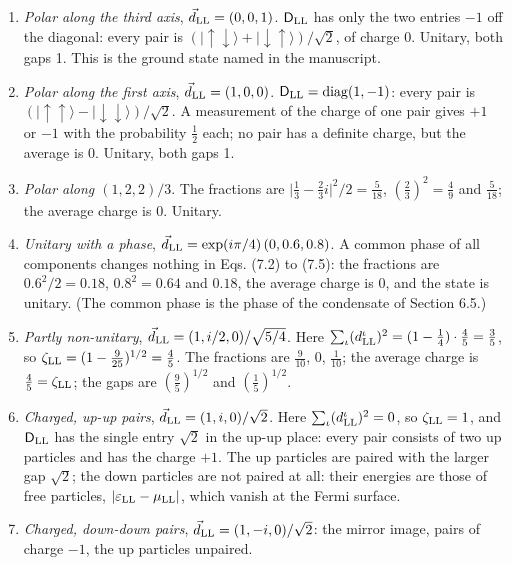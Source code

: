 \documentclass[
  10pt,
]{article}
\providecommand{\tightlist}{%
  \setlength{\itemsep}{0pt}\setlength{\parskip}{0pt}}
\begin{document}
\begin{enumerate}
\def\labelenumi{\arabic{enumi}.}
\tightlist
\item
  \emph{Polar along the third axis}, \(\vec d_{\rm LL}=(0,0,1)\).
  \(\mathsf D_{\rm LL}\) has only the two entries \(-1\) off the
  diagonal: every pair is
  \((\lvert\uparrow\downarrow\rangle+\lvert\downarrow\uparrow\rangle)/\sqrt2\),
  of charge 0. Unitary, both gaps 1. This is the ground state named in
  the manuscript.
\item
  \emph{Polar along the first axis}, \(\vec d_{\rm LL}=(1,0,0)\).
  \(\mathsf D_{\rm LL}=\mathrm{diag}(1,-1)\): every pair is
  \((\lvert\uparrow\uparrow\rangle-\lvert\downarrow\downarrow\rangle)/\sqrt2\).
  A measurement of the charge of one pair gives \(+1\) or \(-1\) with
  the probability \(\tfrac12\) each; no pair has a definite charge, but
  the average is 0. Unitary, both gaps 1.
\item
  \emph{Polar along \((1,2,2)/3\)}. The fractions are
  \(\lvert\tfrac13-\tfrac23i\rvert^2/2=\tfrac5{18}\),
  \((\tfrac23)^2=\tfrac49\) and \(\tfrac5{18}\); the average charge is
  0. Unitary.
\item
  \emph{Unitary with a phase},
  \(\vec d_{\rm LL}=\exp(i\pi/4)\,(0,0.6,0.8)\). A common phase of all
  components changes nothing in Eqs. (7.2) to (7.5): the fractions are
  \(0.6^2/2=0.18\), \(0.8^2=0.64\) and \(0.18\), the average charge is
  0, and the state is unitary. (The common phase is the phase of the
  condensate of Section 6.5.)
\item
  \emph{Partly non-unitary}, \(\vec d_{\rm LL}=(1,i/2,0)/\sqrt{5/4}\).
  Here
  \(\sum_\iota(d^\iota_{\rm LL})^2=(1-\tfrac14)\cdot\tfrac45=\tfrac35\),
  so \(\zeta_{\rm LL}=(1-\tfrac9{25})^{1/2}=\tfrac45\). The fractions
  are \(\tfrac9{10}\), 0, \(\tfrac1{10}\); the average charge is
  \(\tfrac45=\zeta_{\rm LL}\); the gaps are \((\tfrac95)^{1/2}\) and
  \((\tfrac15)^{1/2}\).
\item
  \emph{Charged, up-up pairs}, \(\vec d_{\rm LL}=(1,i,0)/\sqrt2\). Here
  \(\sum_\iota(d^\iota_{\rm LL})^2=0\), so \(\zeta_{\rm LL}=1\), and
  \(\mathsf D_{\rm LL}\) has the single entry \(\sqrt2\) in the up-up
  place: every pair consists of two up particles and has the charge
  \(+1\). The up particles are paired with the larger gap \(\sqrt2\);
  the down particles are not paired at all: their energies are those of
  free particles, \(\lvert\varepsilon_{\rm LL}-\mu_{\rm LL}\rvert\),
  which vanish at the Fermi surface.
\item
  \emph{Charged, down-down pairs}, \(\vec d_{\rm LL}=(1,-i,0)/\sqrt2\):
  the mirror image, pairs of charge \(-1\), the up particles unpaired.
\end{enumerate}
\end{document}
